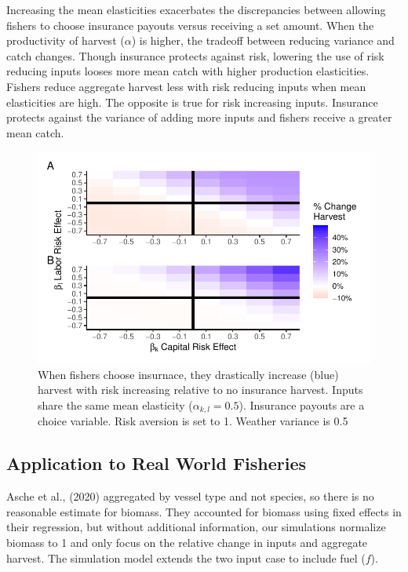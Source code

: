 \documentclass[
  letterpaper,
  DIV=11,
  numbers=noendperiod]{scrartcl}
\theoremstyle{plain}
\theoremstyle{plain}
\theoremstyle{remark}
\begin{document}
Increasing the mean elasticities exacerbates the discrepancies between
allowing fishers to choose insurance payouts versus receiving a set
amount. When the productivity of harvest (\(\alpha\)) is higher, the
tradeoff between reducing variance and catch changes. Though insurance
protects against risk, lowering the use of risk reducing inputs looses
more mean catch with higher production elasticities. Fishers reduce
aggregate harvest less with risk reducing inputs when mean elasticities
are high. The opposite is true for risk increasing inputs. Insurance
protects against the variance of adding more inputs and fishers receive
a greater mean catch.

\begin{figure}

{\centering \includegraphics{ibi-behavior_files/figure-pdf/fig-multi-h-even-hi-1.pdf}

}

\caption{\label{fig-multi-h-even-hi}When fishers choose insurnace, they
drastically increase (blue) harvest with risk increasing relative to no
insurance harvest. Inputs share the same mean elasticity
(\(\alpha_{k,l}=0.5\)). Insurance payouts are a choice variable. Risk
aversion is set to 1. Weather variance is 0.5}

\end{figure}

\hypertarget{application-to-real-world-fisheries}{%
\subsection{Application to Real World
Fisheries}\label{application-to-real-world-fisheries}}

Asche et al., (2020) aggregated by vessel type and not species, so there
is no reasonable estimate for biomass. They accounted for biomass using
fixed effects in their regression, but without additional information,
our simulations normalize biomass to 1 and only focus on the relative
change in inputs and aggregate harvest. The simulation model extends the
two input case to include fuel (\(f\)).
\end{document}
